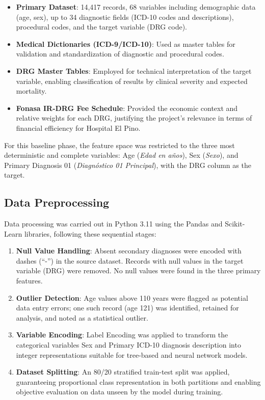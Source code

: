\documentclass{IEEEtran}
\begin{document}
\begin{itemize}
    \item \textbf{Primary Dataset}: 14,417 records, 68 variables including demographic data (age, sex), up to 34 diagnostic fields (ICD-10 codes and descriptions), procedural codes, and the target variable (DRG code).
    \item \textbf{Medical Dictionaries (ICD-9/ICD-10)}: Used as master tables for validation and standardization of diagnostic and procedural codes.
    \item \textbf{DRG Master Tables}: Employed for technical interpretation of the target variable, enabling classification of results by clinical severity and expected mortality.
    \item \textbf{Fonasa IR-DRG Fee Schedule}: Provided the economic context and relative weights for each DRG, justifying the project's relevance in terms of financial efficiency for Hospital El Pino.
\end{itemize}

For this baseline phase, the feature space was restricted to the three most deterministic and complete variables: Age (\textit{Edad en a\~nos}), Sex (\textit{Sexo}), and Primary Diagnosis 01 (\textit{Diagn\'ostico 01 Principal}), with the DRG column as the target.

\subsection{Data Preprocessing}
Data processing was carried out in Python 3.11 using the Pandas and Scikit-Learn libraries, following these sequential stages:

\begin{enumerate}
    \item \textbf{Null Value Handling}: Absent secondary diagnoses were encoded with dashes (``-'') in the source dataset. Records with null values in the target variable (DRG) were removed. No null values were found in the three primary features.
    \item \textbf{Outlier Detection}: Age values above 110 years were flagged as potential data entry errors; one such record (age 121) was identified, retained for analysis, and noted as a statistical outlier.
    \item \textbf{Variable Encoding}: Label Encoding was applied to transform the categorical variables Sex and Primary ICD-10 diagnosis description into integer representations suitable for tree-based and neural network models.
    \item \textbf{Dataset Splitting}: An 80/20 stratified train-test split was applied, guaranteeing proportional class representation in both partitions and enabling objective evaluation on data unseen by the model during training.
\end{enumerate}
\end{document}
